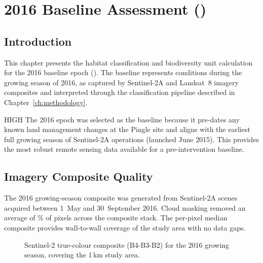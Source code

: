 \chapter{2016 Baseline Assessment (\Tzero)}
\label{ch:baseline}

\section{Introduction}

This chapter presents the habitat classification and biodiversity unit calculation for the 2016 baseline epoch (\Tzero). The baseline represents conditions during the growing season of 2016, as captured by Sentinel-2A and Landsat~8 imagery composites and interpreted through the classification pipeline described in Chapter~\ref{ch:methodology}.

\begin{confidencebox}{HIGH}
The 2016 epoch was selected as the baseline because it pre-dates any known land management changes at the Pingle site and aligns with the earliest full growing season of Sentinel-2A operations (launched June 2015). This provides the most robust remote sensing data available for a pre-intervention baseline.
\end{confidencebox}

\section{Imagery Composite Quality}

The 2016 growing-season composite was generated from  Sentinel-2A scenes acquired between 1~May and 30~September 2016. Cloud masking removed an average of \% of pixels across the composite stack. The per-pixel median composite provides wall-to-wall coverage of the study area with no data gaps.

\begin{figure}[H]
\centering
{}
\caption{Sentinel-2 true-colour composite (B4-B3-B2) for the 2016 growing season, covering the 1\,km study area.}
\label{fig:composite-2016}
\end{figure}


